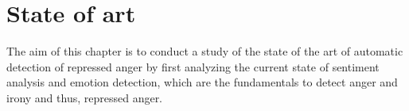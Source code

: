 \chapter{State of art}

The aim of this chapter is to conduct a study of the state of the art of automatic detection of repressed anger by first analyzing the current state of sentiment analysis and emotion detection, which are the fundamentals to detect anger and irony and thus, repressed anger.





